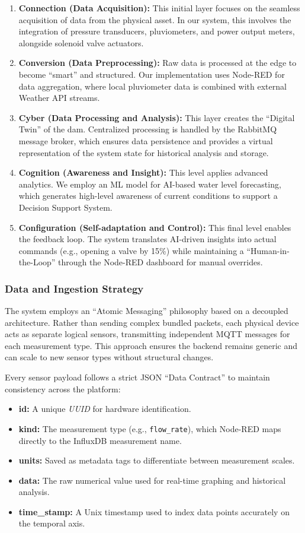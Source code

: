 \begin{enumerate}
    \item \textbf{Connection (Data Acquisition):} This initial layer focuses on the seamless acquisition of data from the physical asset. In our system, this involves the integration of pressure transducers, pluviometers, and power output meters, alongside solenoid valve actuators.
    \item \textbf{Conversion (Data Preprocessing):} Raw data is processed at the edge to become ``smart'' and structured. Our implementation uses Node-RED for data aggregation, where local pluviometer data is combined with external Weather API streams.
    \item \textbf{Cyber (Data Processing and Analysis):} This layer creates the ``Digital Twin'' of the dam. Centralized processing is handled by the RabbitMQ message broker, which ensures data persistence and provides a virtual representation of the system state for historical analysis and storage.
    \item \textbf{Cognition (Awareness and Insight):} This level applies advanced analytics. We employ an ML model for AI-based water level forecasting, which generates high-level awareness of current conditions to support a Decision Support System.
    \item \textbf{Configuration (Self-adaptation and Control):} This final level enables the feedback loop. The system translates AI-driven insights into actual commands (e.g., opening a valve by 15\%) while maintaining a ``Human-in-the-Loop'' through the Node-RED dashboard for manual overrides.
\end{enumerate}

\subsubsection{Data and Ingestion Strategy}
The system employs an ``Atomic Messaging'' philosophy based on a decoupled architecture. Rather than sending complex bundled packets, each physical device acts as separate logical sensors, transmitting independent MQTT messages for each measurement type. This approach ensures the backend remains generic and can scale to new sensor types without structural changes.

Every sensor payload follows a strict JSON ``Data Contract'' to maintain consistency across the platform:
\begin{itemize}
    \item \textbf{id:} A unique \textit{UUID} for hardware identification.
    \item \textbf{kind:} The measurement type (e.g., \texttt{flow\_rate}), which Node-RED maps directly to the InfluxDB measurement name.
    \item \textbf{units:} Saved as metadata tags to differentiate between measurement scales.
    \item \textbf{data:} The raw numerical value used for real-time graphing and historical analysis.
    \item \textbf{time\_stamp:} A Unix timestamp used to index data points accurately on the temporal axis.
\end{itemize}

